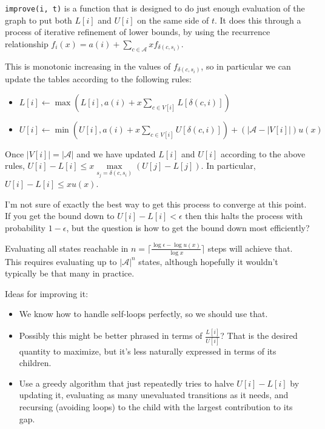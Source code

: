 \texttt{improve(i, t)} is a function that is designed to do just enough evaluation of the graph to put both \(L[i]\) and \(U[i]\) on the same side of \(t\).
It does this through a process of iterative refinement of lower bounds,
by using the recurrence relationship \(f_i(x) = a(i) + \sum\limits_{c \in \mathcal{A}} x f_{\delta(c, s_i)}\).

This is monotonic increasing in the values of \(f_{\delta(c, s_i)}\),
so in particular we can update the tables according to the following rules:

\begin{itemize}
\item \(L[i] \leftarrow \max(L[i], a(i) + x \sum\limits_{c \in V[i]} L[\delta(c, i)])\)
\item \(U[i] \leftarrow \min(U[i], a(i) + x \sum\limits_{c \in V[i]} U[\delta(c, i)]) + (|\mathcal{A} - |V[i]|)u(x)\)
\end{itemize}

\begin{proposition}
Once \(|V[i]| = |\mathcal{A}|\) and we have updated \(L[i]\) and \(U[i]\) according to the above rules,
\(U[i] - L[i] \leq x \max\limits_{s_j = \delta(c, s_i)} (U[j] - L[j])\).
In particular, \(U[i] - L[i] \leq x u(x)\).
\end{proposition}

I'm not sure of exactly the best way to get this process to converge at this point.
If you get the bound down to \(U[i] - L[i] < \epsilon\) then this halts the process with probability \(1 - \epsilon\),
but the question is how to get the bound down most efficiently?

Evaluating all states reachable in \(n = \lceil\frac{\log \epsilon - \log u(x)}{\log x}\rceil\) steps will achieve that.
This requires evaluating up to \(|\mathcal{A}|^n\) states,
although hopefully it wouldn't typically be that many in practice.

Ideas for improving it:

\begin{itemize}
\item We know how to handle self-loops perfectly, so we should use that.
\item Possibly this might be better phrased in terms of \(\frac{L[i]}{U[i]}\)?
That is the desired quantity to maximize, but it's less naturally expressed in terms of its children.
\item Use a greedy algorithm that just repeatedly tries to halve \(U[i] - L[i]\) by updating it,
evaluating as many unevaluated transitions as it needs, and recursing (avoiding loops) to the child with the largest contribution to its gap.
\end{itemize}

